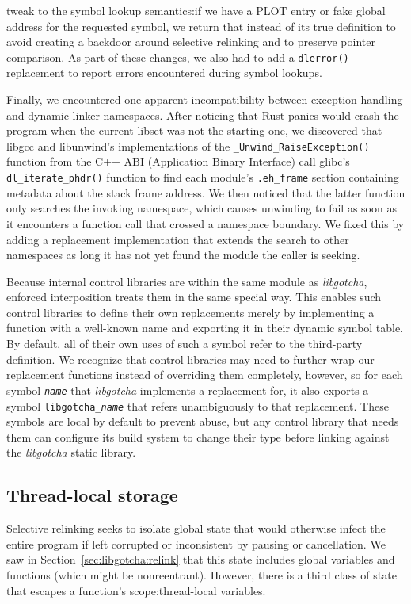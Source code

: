 tweak to the symbol lookup semantics:\@ if we have a PLOT entry or fake global
address for the requested symbol, we return that instead of its true definition to
avoid creating a backdoor around selective relinking and to preserve pointer
comparison.  As part of these changes, we also had to add a
\texttt{dlerror()} replacement to report errors encountered during symbol lookups.

Finally, we encountered one apparent incompatibility between exception handling and
dynamic linker namespaces.  After noticing that Rust panics would crash the program
when the current libset was not the starting one, we discovered that libgcc and
libunwind's implementations of the \texttt{\_Unwind\_RaiseException()} function from
the C++ ABI (Application Binary Interface) call glibc's \texttt{dl\_iterate\_phdr()}
function to find each module's
\texttt{.eh\_frame} section containing metadata about the stack frame address.  We
then noticed that the latter function only searches the invoking namespace, which
causes unwinding to fail as soon as it encounters a function call that crossed a
namespace boundary.  We fixed this by adding a replacement implementation that
extends the search to other namespaces as long it has not yet found the module the
caller is seeking.

Because internal control libraries are within the same module as \textit{libgotcha},
enforced interposition treats them in the same special way.  This enables such
control libraries to define their own replacements merely by implementing a function
with a well-known name and exporting it in their dynamic symbol table.  By default,
all of their own uses of such a symbol refer to the third-party definition.  We
recognize that control libraries may need to further wrap our replacement functions
instead of overriding them completely, however, so for each symbol
\texttt{\textit{name}} that \textit{libgotcha} implements a replacement for, it also
exports a symbol \texttt{libgotcha\_\textit{name}} that refers unambiguously to that
replacement.  These symbols are local by default to prevent abuse, but any control
library that needs them can configure its build system to change their type before
linking against the \textit{libgotcha} static library.


\subsection{Thread-local storage}
\label{sec:libgotcha:tls}

Selective relinking seeks to isolate global state that would otherwise infect the
entire program if left corrupted or inconsistent by pausing or cancellation.  We saw
in Section~\ref{sec:libgotcha:relink} that this state includes global variables and
functions (which might be nonreentrant).  However, there is a third class of state
that escapes a function's scope:\@ thread-local variables.

